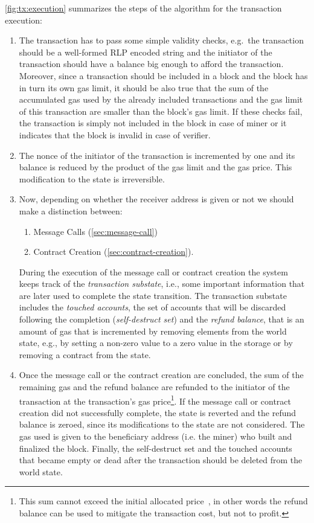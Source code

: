 \autoref{fig:tx:execution} summarizes the steps of the algorithm for the
transaction execution:
\begin{enumerate}
	\item The transaction has to pass some simple validity checks, e.g.\ the
	transaction should be a well-formed RLP encoded string and the initiator of
	the transaction should have a balance big enough to afford the transaction.
	Moreover, since a transaction should be included in a block and the block
	has in turn its own gas limit, it should be also true that the sum of the
	accumulated gas used by the already included transactions and the gas limit
	of this transaction are smaller than the block's gas limit. If these checks
	fail, the transaction is simply not included in the block in case of miner
	or it indicates that the block is invalid in case of verifier.
	\item The nonce of the initiator of the transaction is incremented by one
    and its balance is reduced by the product of the gas limit and the gas
    price. This modification to the state is irreversible.
	\item Now, depending on whether the receiver address is given or not we
	should make a distinction between:
	\begin{enumerate}[label=\alph*.]
		\item Message Calls (\autoref{sec:message-call})
		\item Contract Creation (\autoref{sec:contract-creation}).
	\end{enumerate}
	During the execution of the message call or contract creation the system
	keeps track of the \emph{transaction substate}, i.e., some important
	information that are later used to complete the state transition. The
	transaction substate includes the \emph{touched accounts}, the set of
	accounts that will be discarded following the completion
	(\emph{self-destruct set}) and the \emph{refund balance}, that is an amount
	of gas that is incremented by removing elements from the world state, e.g.,
	by setting a non-zero value to a zero value in the storage or by removing a
	contract from the state.
	\item Once the message call or the contract creation are concluded, the sum
    of the remaining gas and the refund balance are refunded to the initiator of
    the transaction at the transaction's gas price\footnote{This sum cannot
    exceed the initial allocated price~\cite{wood2018ethereum}, in other words
    the refund balance can be used to mitigate the transaction cost, but not to
    profit.}. If the message call or contract creation did not successfully
    complete, the state is reverted and the refund balance is zeroed, since its
    modifications to the state are not considered. The gas used is given to the
    beneficiary address (i.e. the miner) who built and finalized the block.
    Finally, the self-destruct set and the touched accounts that became empty or
    dead after the transaction should be deleted from the world state.
\end{enumerate}
